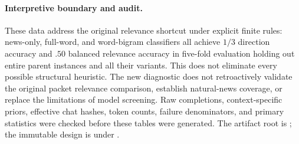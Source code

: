 \begin{center}
\begin{minipage}{\linewidth}
\centering
{}
\label{tab:exp1-fresh-triples}
\small

\end{minipage}
\end{center}

\begin{center}
\begin{minipage}{\linewidth}
\centering
{}
\label{tab:exp1-fresh-accounting}
\small

\end{minipage}
\end{center}

\paragraph{Interpretive boundary and audit.}
These data address the original relevance shortcut under explicit finite rules:
news-only, full-word, and word-bigram classifiers all achieve $1/3$ direction
accuracy and $.50$ balanced relevance accuracy in five-fold evaluation holding
out entire parent instances and all their variants. This does not eliminate every
possible structural heuristic. The new diagnostic does not retroactively validate
the original packet relevance comparison, establish natural-news coverage, or
replace the limitations of model screening. Raw completions, context-specific
priors, effective chat hashes, token counts, failure denominators, and primary
statistics were checked before these tables were generated. The artifact root is
; the immutable
design is under .
